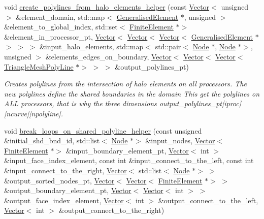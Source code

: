 \begin{DoxyCompactItemize}
void \hyperlink{classoomph_1_1TriangleMesh_a1589b532530c3a8ddfb88f93b2e832ea}{create\+\_\+polylines\+\_\+from\+\_\+halo\+\_\+elements\+\_\+helper} (const \hyperlink{classoomph_1_1Vector}{Vector}$<$ unsigned $>$ \&element\+\_\+domain, std\+::map$<$ \hyperlink{classoomph_1_1GeneralisedElement}{Generalised\+Element} $\ast$, unsigned $>$ \&element\+\_\+to\+\_\+global\+\_\+index, std\+::set$<$ \hyperlink{classoomph_1_1FiniteElement}{Finite\+Element} $\ast$$>$ \&element\+\_\+in\+\_\+processor\+\_\+pt, \hyperlink{classoomph_1_1Vector}{Vector}$<$ \hyperlink{classoomph_1_1Vector}{Vector}$<$ \hyperlink{classoomph_1_1Vector}{Vector}$<$ \hyperlink{classoomph_1_1GeneralisedElement}{Generalised\+Element} $\ast$$>$ $>$ $>$ \&input\+\_\+halo\+\_\+elements, std\+::map$<$ std\+::pair$<$ \hyperlink{classoomph_1_1Node}{Node} $\ast$, \hyperlink{classoomph_1_1Node}{Node} $\ast$$>$, unsigned $>$ \&elements\+\_\+edges\+\_\+on\+\_\+boundary, \hyperlink{classoomph_1_1Vector}{Vector}$<$ \hyperlink{classoomph_1_1Vector}{Vector}$<$ \hyperlink{classoomph_1_1Vector}{Vector}$<$ \hyperlink{classoomph_1_1TriangleMeshPolyLine}{Triangle\+Mesh\+Poly\+Line} $\ast$$>$ $>$ $>$ \&output\+\_\+polylines\+\_\+pt)
\begin{DoxyCompactList}\small\item\em Creates polylines from the intersection of halo elements on all processors. The new polylines define the shared boundaries in the domain This get the polylines on A\+LL processors, that is why the three dimensions output\+\_\+polylines\+\_\+pt\mbox{[}iproc\mbox{]}\mbox{[}ncurve\mbox{]}\mbox{[}npolyline\mbox{]}. \end{DoxyCompactList}\item 
void \hyperlink{classoomph_1_1TriangleMesh_a191f27cfdca85947cb9391f6d593723f}{break\+\_\+loops\+\_\+on\+\_\+shared\+\_\+polyline\+\_\+helper} (const unsigned \&initial\+\_\+shd\+\_\+bnd\+\_\+id, std\+::list$<$ \hyperlink{classoomph_1_1Node}{Node} $\ast$$>$ \&input\+\_\+nodes, \hyperlink{classoomph_1_1Vector}{Vector}$<$ \hyperlink{classoomph_1_1FiniteElement}{Finite\+Element} $\ast$$>$ \&input\+\_\+boundary\+\_\+element\+\_\+pt, \hyperlink{classoomph_1_1Vector}{Vector}$<$ int $>$ \&input\+\_\+face\+\_\+index\+\_\+element, const int \&input\+\_\+connect\+\_\+to\+\_\+the\+\_\+left, const int \&input\+\_\+connect\+\_\+to\+\_\+the\+\_\+right, \hyperlink{classoomph_1_1Vector}{Vector}$<$ std\+::list$<$ \hyperlink{classoomph_1_1Node}{Node} $\ast$$>$ $>$ \&output\+\_\+sorted\+\_\+nodes\+\_\+pt, \hyperlink{classoomph_1_1Vector}{Vector}$<$ \hyperlink{classoomph_1_1Vector}{Vector}$<$ \hyperlink{classoomph_1_1FiniteElement}{Finite\+Element} $\ast$$>$ $>$ \&output\+\_\+boundary\+\_\+element\+\_\+pt, \hyperlink{classoomph_1_1Vector}{Vector}$<$ \hyperlink{classoomph_1_1Vector}{Vector}$<$ int $>$ $>$ \&output\+\_\+face\+\_\+index\+\_\+element, \hyperlink{classoomph_1_1Vector}{Vector}$<$ int $>$ \&output\+\_\+connect\+\_\+to\+\_\+the\+\_\+left, \hyperlink{classoomph_1_1Vector}{Vector}$<$ int $>$ \&output\+\_\+connect\+\_\+to\+\_\+the\+\_\+right)

\end{DoxyCompactItemize}
